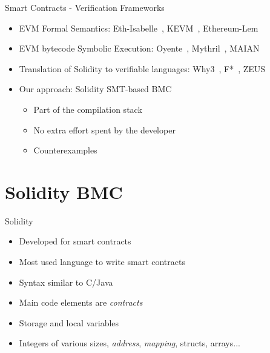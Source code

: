 \documentclass{beamer}
\begin{document}
\begin{frame}{Smart Contracts - Verification Frameworks}
\begin{itemize}
	\item EVM Formal Semantics: Eth-Isabelle~\cite{Eth-Isabelle}, KEVM~\cite{KEVM}, Ethereum-Lem~\cite{Ethereum-Lem} \bigskip
	\item EVM bytecode Symbolic Execution: Oyente~\cite{Luu2016}, Mythril~\cite{Mythril}, MAIAN~\cite{NKSSH18} \bigskip
	\item Translation of Solidity to verifiable languages: Why3~\cite{Why3}, F*~\cite{Bhargavan2016}, ZEUS~\cite{ZEUS} \bigskip
	\item Our approach: Solidity SMT-based BMC
	\begin{itemize}
		\item Part of the compilation stack
		\item No extra effort spent by the developer
		\item Counterexamples
	\end{itemize}
\end{itemize}
\end{frame}



\section{Solidity BMC}

\begin{frame}{Solidity}
\begin{itemize}
	\item Developed for smart contracts \bigskip
	\item Most used language to write smart contracts \bigskip
	\item Syntax similar to C/Java \bigskip
	\item Main code elements are \emph{contracts} \bigskip
	\item Storage and local variables \bigskip
	\item Integers of various sizes, \emph{address}, \emph{mapping}, structs, arrays...
\end{itemize}
\end{frame}
\end{document}

